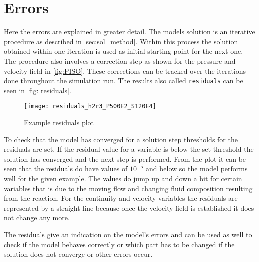 \documentclass[../thesis.tex]{subfiles}
\begin{document}
\section{Errors}
Here the errors are explained in greater detail.
The models solution is an iterative procedure as described in \autoref{sec:sol_method}. Within this process the solution obtained within one iteration is used as initial starting point for the next one. The procedure also involves a correction step as shown for the pressure and velocity field in \autoref{fig:PISO}. These corrections can be tracked over the iterations done throughout the simulation run. The results also called \texttt{residuals} can be seen in \autoref{fig: residuals}.
\begin{figure}[htbp]
	\centering
	\texttt{[image: residuals\_h2r3\_P500E2\_S120E4]}
	\caption{Example residuals plot}
	\label{fig: residuals}
\end{figure}
To check that the model has converged for a solution step thresholds for the residuals are set. If the residual value for a variable is below the set threshold the solution has converged and the next step is performed. From the plot it can be seen that the residuals do have values of $10^{-5}$ and below so the model performs well for the given example. The values do jump up and down a bit for certain variables that is due to the moving flow and changing fluid composition resulting from the reaction. For the continuity and velocity variables the residuals are represented by a straight line because once the velocity field is established it does not change any more.

The residuals give an indication on the model's errors and can be used as well to check if the model behaves correctly or which part has to be changed if the solution does not converge or other errors occur.
\end{document}
